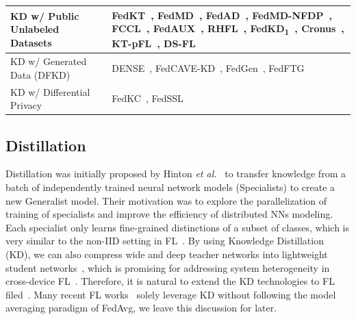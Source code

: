 \begin{table}[t]
\begin{tabular}{|ll|p{12cm}|}
    \multicolumn{2}{|l|}{KD w/ Public Unlabeled Datasets} & FedKT~\cite{li2021practical}, FedMD~\cite{li2019fedmd}, FedAD~\cite{gong2021ensemble}, FedMD-NFDP~\cite{sun2020federated}, FCCL~\cite{huang2022learn}, FedAUX~\cite{sattler2021fedaux}, RHFL~\cite{fang2022robust}, FedKD\textsubscript{1}~\cite{gong2022preserving}, Cronus~\cite{chang2021cronus}, KT-pFL~\cite{zhang2021parameterized}, DS-FL~\cite{itahara2021distillation} \\ \hline
    \multicolumn{2}{|l|}{KD w/ Generated Data (DFKD)} & DENSE~\cite{zhang2022dense}, FedCAVE-KD~\cite{heinbaugh2023data}, FedGen~\cite{zhu2021data},
    FedFTG~\cite{zhang2022fine} \\ \hline 
    \multicolumn{2}{|l|}{KD w/ Differential Privacy} & FedKC~\cite{wang2022fedkc}, FedSSL~\cite{fan2022private}  \\ \hline
    \end{tabular}
    \vspace{-5mm}
\end{table}

\subsection{Distillation}
\label{sec:distillation}
Distillation was initially proposed by Hinton \textit{et al.}~\cite{hinton2015distilling} to transfer knowledge from a batch of independently trained neural network models (Specialists) to create a new Generalist model.
Their motivation was to explore the parallelization of training of specialists and improve the efficiency of distributed NNs modeling\cite{dean2012large}.
Each specialist only learns fine-grained distinctions of a subset of classes, which is very similar to the non-IID setting in FL~\cite{liqb2022federated}.
By using Knowledge Distillation (KD), we can also compress wide and deep teacher networks into lightweight student networks~\cite{romero2015fitnets}, which is promising for addressing system heterogeneity in cross-device FL~\cite{lim2020federated}.
Therefore, it is natural to extend the KD technologies to FL filed~\cite{wu2022communication}.
Many recent FL works~\cite{aketi2024cross, luo2022fediris, tan2022fedproto}
solely leverage KD without following the model averaging paradigm of FedAvg, we leave this discussion for later. %

